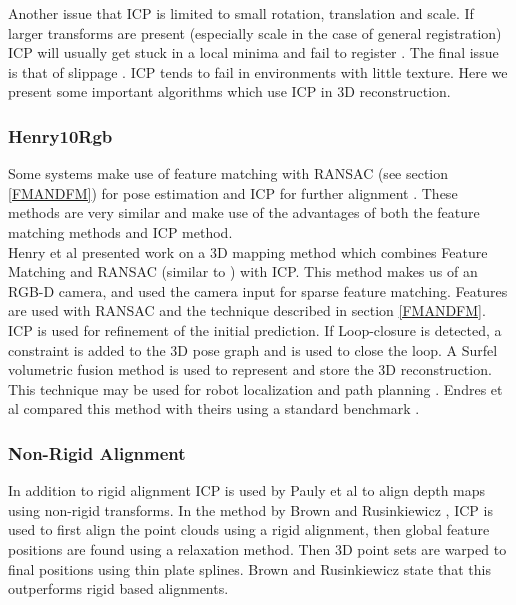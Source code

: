 Another issue that ICP is limited to small rotation, translation and scale. If larger transforms are present (especially scale in the case of general registration) ICP will usually get stuck in a local minima and fail to register \cite{Mitra04Registration}. The final issue is that of slippage \cite{Whelan13Robust}. ICP tends to fail in environments with little texture. Here we present some important algorithms which use ICP in 3D reconstruction.

\subsubsection{Henry10Rgb}

Some systems make use of feature matching with RANSAC (see section \ref{FMANDFM}) for pose estimation and ICP for further alignment \cite{Engelhard11Real, Henry10Rgb}. These methods are very similar and make use of the advantages of both the feature matching methods and ICP method. \\

Henry et al \cite{Henry10Rgb} presented work on a 3D mapping method which combines Feature Matching and RANSAC (similar to \cite{Endres12Evaluation}) with ICP. This method makes us of an RGB-D camera, and used the camera input for sparse feature matching. Features are used with RANSAC and the technique described in section \ref{FMANDFM}. ICP is used for refinement of the initial prediction. If Loop-closure is detected, a constraint is added to the 3D pose graph \cite{Kummerle11G} and is used to close the loop. A Surfel \cite{Pfister00Surfels} volumetric fusion method is used to represent and store the 3D reconstruction. This technique may be used for robot localization and path planning \cite{Hornung10Humanoid}. Endres et al \cite{Endres12Evaluation} compared this method with theirs using a standard benchmark \cite{Sturm12Benchmark}.  \\

\subsubsection{Non-Rigid Alignment}

In addition to rigid alignment ICP is used by Pauly et al \cite{Pauly05Example,Brown07Global} to align depth maps using non-rigid transforms. In the method by Brown and Rusinkiewicz \cite{Brown07Global}, ICP is used to first align the point clouds using a rigid alignment, then global feature positions are found using a relaxation method. Then 3D point sets are warped to final positions using thin plate splines. Brown and Rusinkiewicz state that this outperforms rigid based alignments.


